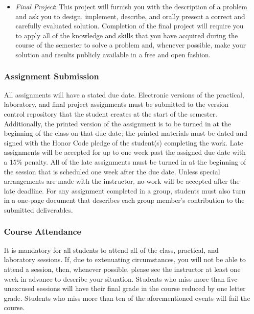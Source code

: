 \begin{itemize}
  \item {\em Final Project\/}: This project will furnish you with the description of a problem and ask you to design,
    implement, describe, and orally present a correct and carefully evaluated solution. Completion of the final project
    will require you to apply all of the knowledge and skills that you have acquired during the course of the semester
    to solve a problem and, whenever possible, make your solution and results publicly available in a free and open
    fashion.

\end{itemize}

\subsubsection*{Assignment Submission}

All assignments will have a stated due date. Electronic versions of the practical, laboratory, and final project
assignments must be submitted to the version control repository that the student creates at the start of the semester.
Additionally, the printed version of the assignment is to be turned in at the beginning of the class on that due date;
the printed materials must be dated and signed with the Honor Code pledge of the student(s) completing the work.  Late
assignments will be accepted for up to one week past the assigned due date with a 15\% penalty. All of the late
assignments must be turned in at the beginning of the session that is scheduled one week after the due date. Unless
special arrangements are made with the instructor, no work will be accepted after the late deadline. For any
assignment completed in a group, students must also turn in a one-page document that describes each group member's
contribution to the submitted deliverables.

\subsubsection*{Course Attendance}

It is mandatory for all students to attend all of the class, practical, and laboratory sessions. If, due to extenuating
circumstances, you will not be able to attend a session, then, whenever possible, please see the instructor at least one
week in advance to describe your situation.  Students who miss more than five unexcused sessions will have their final
grade in the course reduced by one letter grade. Students who miss more than ten of the aforementioned events will fail
the course.

